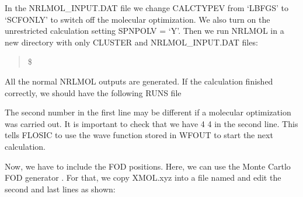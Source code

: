 \documentclass[letterpaper,10pt,english,openany,oneside]{sphinxmanual}
\begin{document}
\sphinxAtStartPar
In the NRLMOL\_INPUT.DAT file we change CALCTYPEV from ‘LBFGS’ to ‘SCF\sphinxhyphen{}ONLY’ to switch off the molecular optimization. We also turn on the unrestricted calculation setting SPNPOLV = ‘Y’. Then we run NRLMOL in a new directory with only CLUSTER and NRLMOL\_INPUT.DAT files:
\begin{quote}

\sphinxAtStartPar
\$ 
\end{quote}

\sphinxAtStartPar
All the normal NRLMOL outputs are generated. If the calculation finished correctly, we should have the following RUNS file

\begin{sphinxVerbatim}[commandchars=\\\{\}]
                       
                            
                            
\end{sphinxVerbatim}

\sphinxAtStartPar
The second number in the first line may be different if a molecular optimization was carried out. It is important to check that we have 4 4 in the second line. This tells FLOSIC to use the wave function stored in WFOUT to start the next calculation.

\sphinxAtStartPar
Now, we have to include the FOD positions. Here, we can use the Monte Cartlo FOD generator . For that, we copy XMOL.xyz into a file named  and edit the second and last lines as shown:

\begin{sphinxVerbatim}[commandchars=\\\{\}]
  
              
              
             

\end{sphinxVerbatim}
\end{document}
